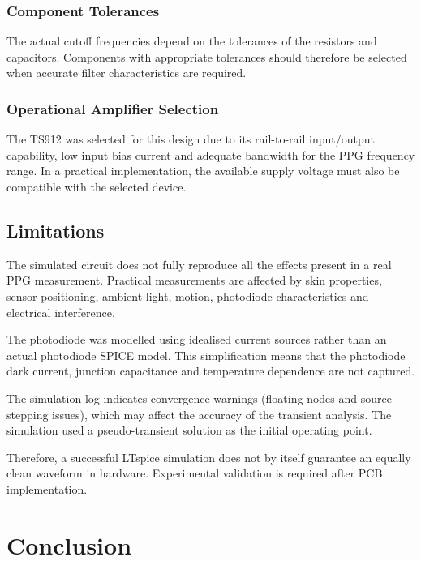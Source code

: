 \documentclass[10pt]{article}
\begin{document}
\subsubsection{Component Tolerances}

The actual cutoff frequencies depend on the tolerances of the resistors and capacitors. Components with appropriate tolerances should therefore be selected when accurate filter characteristics are required.

\subsubsection{Operational Amplifier Selection}

The TS912 was selected for this design due to its rail-to-rail input/output capability, low input bias current and adequate bandwidth for the PPG frequency range. In a practical implementation, the available supply voltage must also be compatible with the selected device.

\subsection{Limitations}

The simulated circuit does not fully reproduce all the effects present in a real PPG measurement. Practical measurements are affected by skin properties, sensor positioning, ambient light, motion, photodiode characteristics and electrical interference.

The photodiode was modelled using idealised current sources rather than an actual photodiode SPICE model. This simplification means that the photodiode dark current, junction capacitance and temperature dependence are not captured.

The simulation log indicates convergence warnings (floating nodes and source-stepping issues), which may affect the accuracy of the transient analysis. The simulation used a pseudo-transient solution as the initial operating point.

Therefore, a successful LTspice simulation does not by itself guarantee an equally clean waveform in hardware. Experimental validation is required after PCB implementation.


\section{Conclusion}
\end{document}
